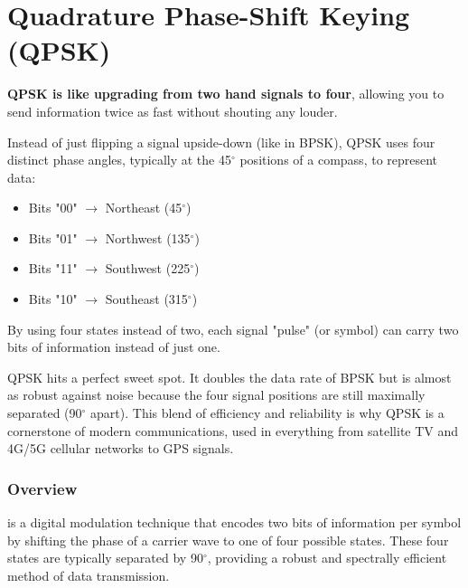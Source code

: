 
\chapter{Quadrature Phase-Shift Keying (QPSK)}
\label{ch:qpsk}

\begin{nontechnical}
    \textbf{QPSK is like upgrading from two hand signals to four}, allowing you to send information twice as fast without shouting any louder.

     Instead of just flipping a signal upside-down (like in BPSK), QPSK uses four distinct phase angles, typically at the 45$^\circ$ positions of a compass, to represent data:
    \begin{itemize}
        \item Bits "00" $\rightarrow$ Northeast (45$^\circ$)
        \item Bits "01" $\rightarrow$ Northwest (135$^\circ$)
        \item Bits "11" $\rightarrow$ Southwest (225$^\circ$)
        \item Bits "10" $\rightarrow$ Southeast (315$^\circ$)
    \end{itemize}
    By using four states instead of two, each signal "pulse" (or symbol) can carry two bits of information instead of just one.

     QPSK hits a perfect sweet spot. It doubles the data rate of BPSK but is almost as robust against noise because the four signal positions are still maximally separated (90$^\circ$ apart). This blend of efficiency and reliability is why QPSK is a cornerstone of modern communications, used in everything from satellite TV and 4G/5G cellular networks to GPS signals.
\end{nontechnical}


\subsection{Overview}

 is a digital modulation technique that encodes two bits of information per symbol by shifting the phase of a carrier wave to one of four possible states. These four states are typically separated by 90$^\circ$, providing a robust and spectrally efficient method of data transmission.


